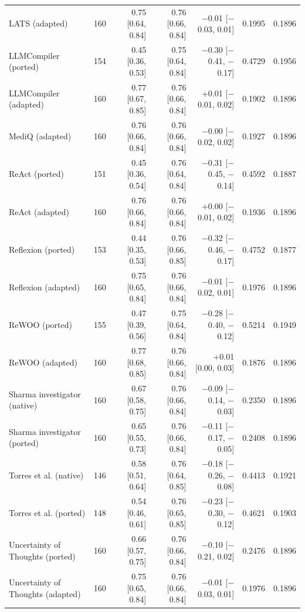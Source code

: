 \documentclass[11pt,a4paper]{article}
\begin{document}
\begin{table}[p]
{\begin{tabular}{lrrrrrr}
LATS (adapted) & 160 & 0.75 [0.64, 0.84] & 0.76 [0.66, 0.84] & $-$0.01 [$-$0.03, 0.01] & 0.1995 & 0.1896 \\
LLMCompiler (ported) & 154 & 0.45 [0.36, 0.53] & 0.75 [0.64, 0.84] & $-$0.30 [$-$0.41, $-$0.17] & 0.4729 & 0.1956 \\
LLMCompiler (adapted) & 160 & 0.77 [0.67, 0.85] & 0.76 [0.66, 0.84] & +0.01 [$-$0.01, 0.02] & 0.1902 & 0.1896 \\
MediQ (adapted) & 160 & 0.76 [0.66, 0.84] & 0.76 [0.66, 0.84] & $-$0.00 [$-$0.02, 0.02] & 0.1927 & 0.1896 \\
ReAct (ported) & 151 & 0.45 [0.36, 0.54] & 0.76 [0.64, 0.84] & $-$0.31 [$-$0.45, $-$0.14] & 0.4592 & 0.1887 \\
ReAct (adapted) & 160 & 0.76 [0.66, 0.84] & 0.76 [0.66, 0.84] & +0.00 [$-$0.01, 0.02] & 0.1936 & 0.1896 \\
Reflexion (ported) & 153 & 0.44 [0.35, 0.53] & 0.76 [0.66, 0.85] & $-$0.32 [$-$0.46, $-$0.17] & 0.4752 & 0.1877 \\
Reflexion (adapted) & 160 & 0.75 [0.65, 0.84] & 0.76 [0.66, 0.84] & $-$0.01 [$-$0.02, 0.01] & 0.1976 & 0.1896 \\
ReWOO (ported) & 155 & 0.47 [0.39, 0.56] & 0.75 [0.64, 0.84] & $-$0.28 [$-$0.40, $-$0.12] & 0.5214 & 0.1949 \\
ReWOO (adapted) & 160 & 0.77 [0.68, 0.85] & 0.76 [0.66, 0.84] & +0.01 [0.00, 0.03] & 0.1876 & 0.1896 \\
Sharma investigator (native) & 160 & 0.67 [0.58, 0.75] & 0.76 [0.66, 0.84] & $-$0.09 [$-$0.14, $-$0.03] & 0.2350 & 0.1896 \\
Sharma investigator (ported) & 160 & 0.65 [0.55, 0.73] & 0.76 [0.66, 0.84] & $-$0.11 [$-$0.17, $-$0.05] & 0.2408 & 0.1896 \\
Torres et al. (native) & 146 & 0.58 [0.51, 0.64] & 0.76 [0.64, 0.85] & $-$0.18 [$-$0.26, $-$0.08] & 0.4413 & 0.1921 \\
Torres et al. (ported) & 148 & 0.54 [0.46, 0.61] & 0.76 [0.65, 0.85] & $-$0.23 [$-$0.30, $-$0.12] & 0.4621 & 0.1903 \\
Uncertainty of Thoughts (ported) & 160 & 0.66 [0.57, 0.75] & 0.76 [0.66, 0.84] & $-$0.10 [$-$0.21, 0.02] & 0.2476 & 0.1896 \\
Uncertainty of Thoughts (adapted) & 160 & 0.75 [0.65, 0.84] & 0.76 [0.66, 0.84] & $-$0.01 [$-$0.03, 0.01] & 0.1976 & 0.1896 \\
\bottomrule
\end{tabular}}
\end{table}
\end{document}
